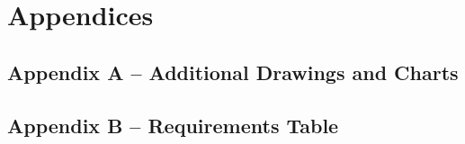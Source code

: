 \documentclass[10pt,a4paper]{article}
\begin{document}


\newpage
\tableofcontents
\newpage











\appendix
\section*{Appendices}

\subsection*{Appendix A -- Additional Drawings and Charts}
\label{app:drawings}

\subsection*{Appendix B -- Requirements Table}
\label{app:requirements}
\end{document}

